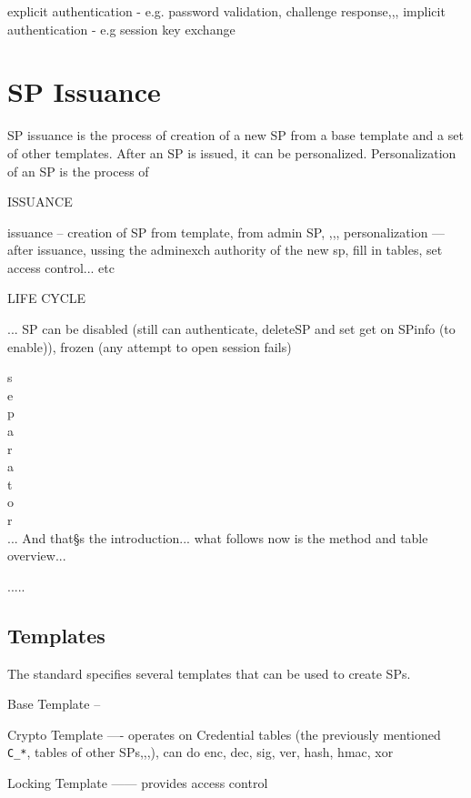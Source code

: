 \documentclass[
  digital, %
  oneside, %
  nolof,     %
  nolot,     %
]{fithesis4}
\begin{document}
explicit authentication - e.g. password validation, challenge response,,,
implicit authentication - e.g session key exchange



\section{SP Issuance}

SP issuance is the process of creation of a new SP from a base template and a set of other templates. After an SP is issued, it can be personalized. Personalization of an SP is the process of 


ISSUANCE

issuance -- creation of SP from template, from admin SP, ,,,
personalization --- after issuance, ussing the adminexch authority of the new sp, fill in tables, set access control... etc

LIFE CYCLE

... SP can be disabled (still can authenticate, deleteSP and set get on SPinfo (to enable)), frozen (any attempt to open session fails)


s \\
e \\
p \\
a \\
r \\
a \\
t \\
o \\
r \\

... And that§s the introduction... what follows now is the method and table overview...


.....

\subsection{Templates}

The standard specifies several templates that can be used to create SPs.


Base Template --

Crypto Template ---- operates on Credential tables (the previously mentioned \verb|C_*|, tables of other SPs,,,), can do enc, dec, sig, ver, hash, hmac, xor

Locking Template ------ provides access control
\end{document}
